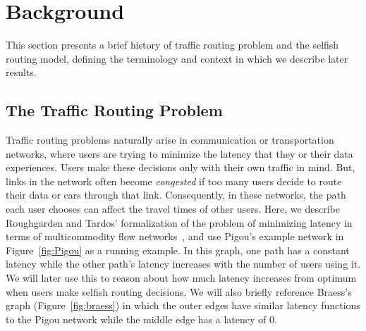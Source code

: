 \section{Background}
\label{sec:background}
This section presents a brief history of traffic routing problem and the selfish routing model, defining the terminology and context in which 
we describe later results.

\subsection{The Traffic Routing Problem}
Traffic routing problems naturally arise in communication or transportation networks, where users are trying to minimize the latency that they or their data experiences. Users make these decisions only with their own traffic in mind.
But, links in the network often become \emph{congested} if too many users decide to route their data 
or cars through that link. Consequently, in these networks, the path each user chooses can affect the travel times of other
users. Here, we describe Roughgarden and Tardos' formalization of the problem of minimizing latency in terms of multicommodity flow networks~\cite{tardos,roughgarden}, and use Pigou's example network in Figure~\ref{fig:Pigou} as a running example. In this graph, one path has a constant latency while the other path's latency increases with the number of users using it. We will later use this to reason about how much latency increases from optimum when users make selfish routing decisions. We will also briefly reference Braess's graph (Figure~\ref{fig:braess}) in which the outer edges have similar latency functions to the Pigou network while the middle edge has a latency of $0$.



